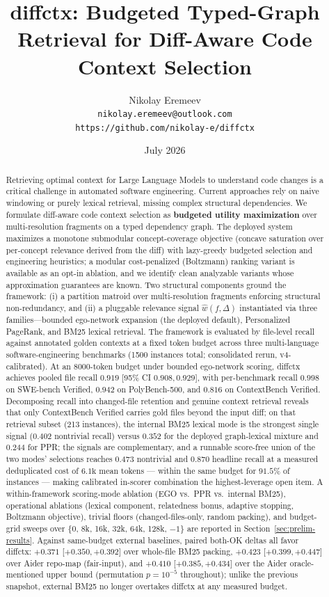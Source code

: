 \documentclass[11pt, a4paper]{article}
\title{diffctx: Budgeted Typed-Graph Retrieval for Diff-Aware Code Context Selection}
\author{
  Nikolay Eremeev \\
  \texttt{nikolay.eremeev@outlook.com} \\
  \texttt{https://github.com/nikolay-e/diffctx}
}
\date{July 2026}
\begin{document}
\maketitle

\begin{abstract}
Retrieving optimal context for Large Language Models to understand code changes is a critical challenge in automated software engineering. Current approaches rely on naive windowing or purely lexical retrieval, missing complex structural dependencies. We formulate diff-aware code context selection as \textbf{budgeted utility maximization} over multi-resolution fragments on a typed dependency graph. The deployed system maximizes a monotone submodular concept-coverage objective (concave saturation over per-concept relevance derived from the diff) with lazy-greedy budgeted selection and engineering heuristics; a modular cost-penalized (Boltzmann) ranking variant is available as an opt-in ablation, and we identify clean analyzable variants whose approximation guarantees are known. Two structural components ground the framework: (i) a partition matroid over multi-resolution fragments enforcing structural non-redundancy, and (ii) a pluggable relevance signal $\hat{w}(f, \Delta)$ instantiated via three families---bounded ego-network expansion (the deployed default), Personalized PageRank, and BM25 lexical retrieval. The framework is evaluated by file-level recall against annotated golden contexts at a fixed token budget across three multi-language software-engineering benchmarks (1500 instances total; consolidated rerun, v4-calibrated). At an $8000$-token budget under bounded ego-network scoring, diffctx achieves pooled file recall $0.919$ [95\% CI $0.908, 0.929$], with per-benchmark recall $0.998$ on SWE-bench Verified, $0.942$ on PolyBench-500, and $0.816$ on ContextBench Verified. Decomposing recall into changed-file retention and genuine context retrieval reveals that only ContextBench Verified carries gold files beyond the input diff; on that retrieval subset (213 instances), the internal BM25 lexical mode is the strongest single signal ($0.402$ nontrivial recall) versus $0.352$ for the deployed graph-lexical mixture and $0.244$ for PPR; the signals are complementary, and a runnable score-free union of the two modes' selections reaches $0.473$ nontrivial and $0.870$ headline recall at a measured deduplicated cost of $6.1\mathrm{k}$ mean tokens --- within the same budget for $91.5\%$ of instances --- making calibrated in-scorer combination the highest-leverage open item. A within-framework scoring-mode ablation (EGO vs.\ PPR vs.\ internal BM25), operational ablations (lexical component, relatedness bonus, adaptive stopping, Boltzmann objective), trivial floors (changed-files-only, random packing), and budget-grid sweeps over $\{$0, 8k, 16k, 32k, 64k, 128k, $-1\}$ are reported in Section~\ref{sec:prelim-results}. Against same-budget external baselines, paired both-OK deltas all favor diffctx: $+0.371$ [$+0.350, +0.392$] over whole-file BM25 packing, $+0.423$ [$+0.399, +0.447$] over Aider repo-map (fair-input), and $+0.410$ [$+0.385, +0.434$] over the Aider oracle-mentioned upper bound (permutation $p = 10^{-5}$ throughout); unlike the previous snapshot, external BM25 no longer overtakes diffctx at any measured budget.

\end{abstract}
\end{document}
